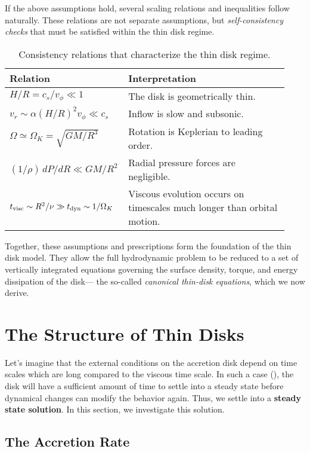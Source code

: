 If the above assumptions hold, several scaling relations and inequalities follow naturally.  
These relations are not separate assumptions, but \emph{self-consistency checks} that must be satisfied within the thin disk regime.

\begin{table}[h!]
\centering
\renewcommand{\arraystretch}{1.4}
\begin{tabular}{p{0.35\linewidth} p{0.58\linewidth}}
\toprule
\textbf{Relation} & \textbf{Interpretation} \\
\midrule
$H/R = c_s / v_\phi \ll 1$ & The disk is geometrically thin. \\[4pt]
$v_r \sim \alpha (H/R)^2 v_\phi \ll c_s$ & Inflow is slow and subsonic. \\[4pt]
$\Omega \simeq \Omega_K = \sqrt{GM/R^3}$ & Rotation is Keplerian to leading order. \\[4pt]
$(1/\rho)\,dP/dR \ll GM/R^2$ & Radial pressure forces are negligible. \\[4pt]
$t_{\rm visc} \sim R^2/\nu \gg t_{\rm dyn} \sim 1/\Omega_K$ & Viscous evolution occurs on timescales much longer than orbital motion. \\[4pt]
\bottomrule
\end{tabular}
\caption{Consistency relations that characterize the thin disk regime.}
\end{table}

\bigskip
Together, these assumptions and prescriptions form the foundation of the thin disk model.  
They allow the full hydrodynamic problem to be reduced to a set of vertically integrated equations governing the surface density, torque, and energy dissipation of the disk— the so-called \emph{canonical thin-disk equations}, which we now derive.

\section{The Structure of Thin Disks}

Let's imagine that the external conditions on the accretion disk depend on time scales which are long compared to the viscous time scale. In such a case (), the disk will have a sufficient amount of time to settle into a steady state before dynamical changes can modify the behavior again. Thus, we settle into a \textbf{steady state solution}. In this section, we investigate this solution.

\subsection{The Accretion Rate}

